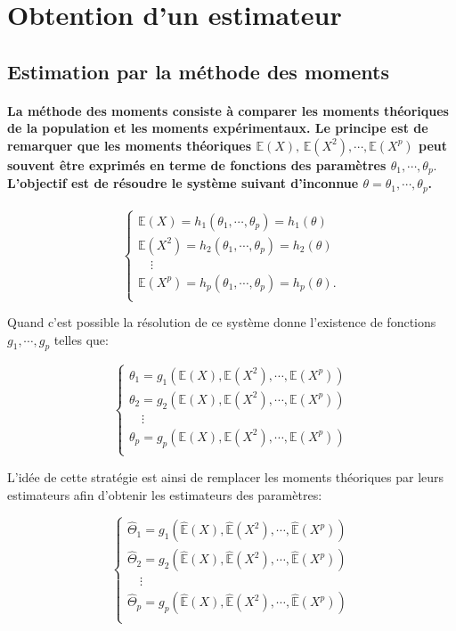 \section{Obtention d'un estimateur}
\subsection{Estimation par la méthode des moments}
\paragraph{La méthode des moments consiste à comparer les moments théoriques de la population et les moments expérimentaux. Le principe est de remarquer que les moments théoriques $\mathbb{E}(X),\,\mathbb{E}(X^2),\cdots{},\mathbb{E}(X^{p})$ peut souvent être exprimés en terme de fonctions des paramètres $\theta_1,\cdots{},\theta_{p}.$ L'objectif est de résoudre le système suivant d'inconnue $\theta=\theta_1,\cdots{},\theta_{p}$.}
\begin{center}
\[
\left\{
\begin{array}{l}
\mathbb{E}(X)=h_{1}(\theta_1,\cdots,\theta_{p})=h_1(\theta) \\
\mathbb{E}(X^2)=h_{2}(\theta_1,\cdots,\theta_{p})=h_2(\theta) \\
\quad \vdots \\
\mathbb{E}(X^p)=h_{p}(\theta_1,\cdots,\theta_{p})=h_p(\theta). \\
\end{array}
\right.
\]
\end{center}
Quand c'est possible la résolution de ce système donne l'existence de fonctions $g_1,\cdots{},g_p$ telles que:
\begin{center}
\[
\left\{
\begin{array}{l}
\theta_1=g_{1}(\mathbb{E}(X),\mathbb{E}(X^2),\cdots{},\mathbb{E}(X^{p})) \\
\theta_2=g_{2}(\mathbb{E}(X),\mathbb{E}(X^2),\cdots{},\mathbb{E}(X^{p})) \\
\quad \vdots \\
\theta_p=g_{p}(\mathbb{E}(X),\mathbb{E}(X^2),\cdots{},\mathbb{E}(X^{p}))\\
\end{array}
\right.
\]
\end{center}
L'id\'ee de cette stratégie est ainsi de remplacer les moments théoriques par leurs estimateurs afin d'obtenir les estimateurs des paramètres:
\begin{center}
\[
\left\{
\begin{array}{l}
\widehat{\Theta}_1=g_{1}(\widehat{\mathbb{E}}(X),\widehat{\mathbb{E}}(X^2),\cdots{},\widehat{\mathbb{E}}(X^{p})) \\
\widehat{\Theta}_2=g_{2}(\widehat{\mathbb{E}}(X),\widehat{\mathbb{E}}(X^2),\cdots{},\widehat{\mathbb{E}}(X^{p})) \\
\quad \vdots \\
\widehat{\Theta}_p=g_{p}(\widehat{\mathbb{E}}(X),\widehat{\mathbb{E}}(X^2),\cdots{},\widehat{\mathbb{E}}(X^{p}))\\
\end{array}
\right.
\]
\end{center}
